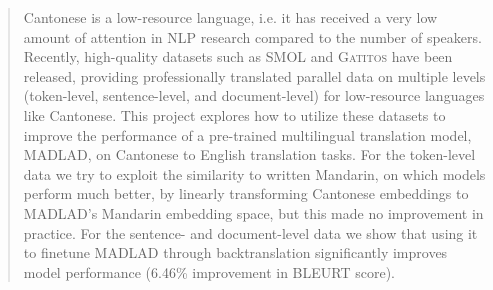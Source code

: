 \begin{abstract}

    Cantonese is a low-resource language, i.e. it has received a very low amount of attention in NLP research compared to the number of speakers. Recently, high-quality datasets such as \textsc{SMOL} and \textsc{Gatitos} have been released, providing professionally translated parallel data on multiple levels (token-level, sentence-level, and document-level) for low-resource languages like Cantonese. This project explores how to utilize these datasets to improve the performance of a pre-trained multilingual translation model, \textsc{MADLAD}, on Cantonese to English translation tasks. For the token-level data we try to exploit the similarity to written Mandarin, on which models perform much better, by linearly transforming Cantonese embeddings to MADLAD's Mandarin embedding space, but this made no improvement in practice. For the sentence- and document-level data we show that using it to finetune MADLAD through backtranslation significantly improves model performance (6.46\% improvement in BLEURT score).
\end{abstract}